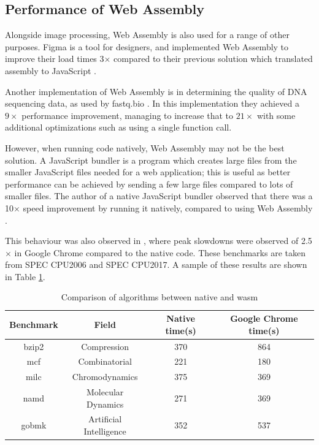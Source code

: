 \documentclass[12pt,a4paper]{article}
\begin{document}



\subsection{Performance of Web Assembly}

Alongside image processing, Web Assembly is also used for a range of other purposes. Figma is a tool for designers, and implemented Web Assembly to improve their load times 3$\times$ compared to their previous solution which translated assembly to JavaScript \cite{figmawasm}.

Another implementation of Web Assembly is in determining the quality of DNA sequencing data, as used by fastq.bio \cite{fastq}. In this implementation they achieved a $9\times $ performance improvement, managing to increase that to $21 \times$ with some additional optimizations such as using a single function call.


However, when running code natively, Web Assembly may not be the best solution. A JavaScript bundler is a program which creates large files from the smaller JavaScript files needed for a web application; this is useful as better performance can be achieved by sending a few large files compared to lots of smaller files. The author of a native JavaScript bundler observed that there was a 10$\times$ speed improvement by running it natively, compared to using Web Assembly \cite{esbuild}.

This behaviour was also observed in \cite{jangda2019not}, where peak slowdowns were observed of 2.5$\times$ in Google Chrome compared to the native code. These benchmarks are taken from SPEC CPU2006 and SPEC CPU2017. A sample of these results are shown in Table \ref{native}.
\begin{table}[H]
    \centering
    \caption{Comparison of algorithms between native and wasm}
    \vspace*{6pt}
    \label{native}
    \begin{tabular}{cccc}\hline\hline
        Benchmark & Field                   & Native time(s) & Google Chrome time(s) \\ \hline
        bzip2     & Compression             & 370            & 864                   \\
        mcf       & Combinatorial           & 221            & 180                   \\
        milc      & Chromodynamics          & 375            & 369                   \\
        namd      & Molecular Dynamics      & 271            & 369                   \\
        gobmk     & Artificial Intelligence & 352            & 537
    \end{tabular}
\end{table}
\end{document}
